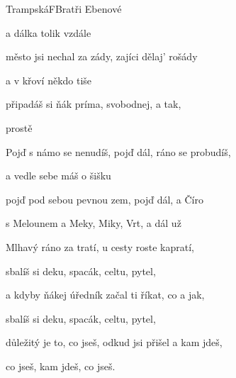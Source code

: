 \setcounter{page}{92}
\begin{song}{Trampská}{F}{Bratři Ebenové}

\begin{SBVerse}


a dálka tolik vzdále

město jsi nechal za zády, zajíci dělaj' rošády

a v křoví někdo tiše 

 připadáš si ňák príma, svobodnej, a tak,

prostě 

\end{SBVerse}

\begin{SBChorus}

Pojď  s námo se nenudíš, pojď dál, ráno se probudíš,

a vedle sebe máš o šišku 

pojď  pod sebou pevnou zem, pojď dál, a Číro 

s Melounem a Meky, Miky, Vrt, a dál už 

\end{SBChorus}

\begin{SBVerse}

Mlhavý ráno za tratí, u cesty roste kapratí,

sbalíš si deku, spacák, celtu, pytel,

a kdyby ňákej úředník začal ti říkat, co a jak,

sbalíš si deku, spacák, celtu, pytel,

důležitý je to, co jseš, odkud jsi přišel a kam jdeš,

co jseš, kam jdeš, co jseš.

\end{SBVerse}

\end{song}

\pagebreak

